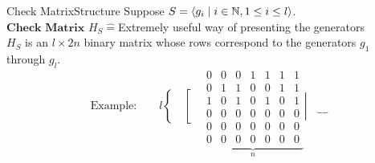 \begin{frame}{Check Matrix}{Structure}
    Suppose \(S=\left\langle g_i\mid i\in\operatorname{\mathbb{N}},1\leq i\leq l\right\rangle\). \\

    \vspace*{2mm}
    \(\textbf{Check Matrix }H_S\widehat{=}\)Extremely useful way of presenting the generators \\

    \vspace*{2mm}
    \(H_S\) is an \(l\times 2n\) binary matrix whose rows correspond to the generators \(g_1\) through \(g_l\). \\
    \[
        \text{Example:}\qquad
        l\left\{\begin{matrix}
                    \, \\ \, \\ \, \\ \, \\ \, \\ \,
        \end{matrix}\right.
        \left[\begin{matrix}
                  \, \\ \, \\ \, \\ \, \\ \, \\ \,
        \end{matrix}\right.
        \underbrace{
            \begin{matrix}
                0 & 0 & 0 & 1 & 1 & 1 & 1 \\
                0 & 1 & 1 & 0 & 0 & 1 & 1 \\
                1 & 0 & 1 & 0 & 1 & 0 & 1 \\
                0 & 0 & 0 & 0 & 0 & 0 & 0 \\
                0 & 0 & 0 & 0 & 0 & 0 & 0 \\
                0 & 0 & 0 & 0 & 0 & 0 & 0
            \end{matrix}
        }_{n}
        \left|\begin{matrix}
                  \, \\ \, \\ \, \\ \, \\ \, \\ \,
        \end{matrix}\right.
        \underbrace{
            \begin{matrix}

\end{matrix}}\]
\end{frame}
